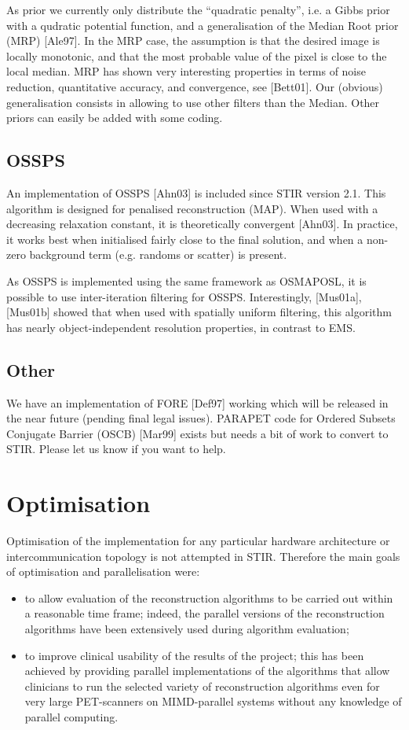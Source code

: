 \documentclass{article}
\begin{document}
As prior we currently only distribute the ``quadratic penalty'', i.e. a
Gibbs prior with a qudratic potential function, and a generalisation of the 
Median Root prior (MRP) [Ale97]. In the MRP case, the assumption 
is that the desired image is locally monotonic, and that the 
most probable value of the pixel is close to the local median. 
MRP has shown very interesting properties in terms of noise reduction, 
quantitative accuracy, and convergence, see [Bett01]. Our (obvious) 
generalisation consists in allowing to use other filters than 
the Median. Other priors can easily be added with some coding. 


\subsection{OSSPS}
An implementation of OSSPS [Ahn03] is included since STIR version 2.1. 
This algorithm is designed for penalised reconstruction (MAP). When used
with a decreasing relaxation constant, it is theoretically convergent [Ahn03].
In practice, it works best when initialised fairly close to the final solution,
and when a non-zero background term (e.g. randoms or scatter) is present.

As OSSPS is implemented using the same framework as OSMAPOSL, it is possible
to use inter-iteration filtering for OSSPS. Interestingly, 
[Mus01a],[Mus01b] showed that when used with spatially uniform filtering,
this algorithm has nearly object-independent
resolution properties, in contrast to EMS.

\subsection{Other}

We have an implementation of FORE  [Def97] working which will 
be released in the near future (pending final legal issues). PARAPET code for 
Ordered Subsets Conjugate Barrier (OSCB) [Mar99] exists but needs
a bit of work to convert to STIR. Please let us know if you 
want to help.
 

\section{
Optimisation}

Optimisation of the implementation for any particular hardware 
architecture or intercommunication topology is not attempted 
in STIR. Therefore the main goals of optimisation and parallelisation 
were:
\begin{itemize}
\item to allow evaluation of the reconstruction algorithms to be 
carried out within a reasonable time frame; indeed, the parallel 
versions of the reconstruction algorithms have been extensively 
used during algorithm evaluation;
\item to improve clinical usability of the results of the project; 
this has been achieved by providing parallel implementations 
of the algorithms that allow clinicians to run the selected variety 
of reconstruction algorithms even for very large PET-scanners 
on MIMD-parallel systems without any knowledge of parallel computing.
\end{itemize}
\end{document}

